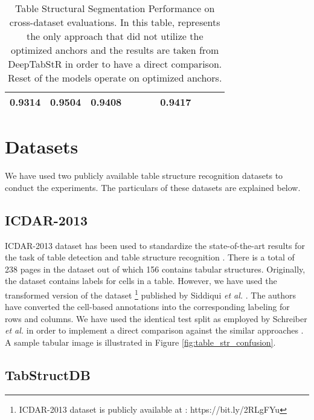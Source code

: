 \documentclass{ieeeaccess}
\begin{document}
\begin{table*}
\begin{tabularx}{\linewidth}{|u|u|t|v|v|k|v|v|k|k|}
        \footnotesize \centering \textbf{0.9314}&
        \footnotesize \centering \textbf{0.9504}&
        \footnotesize \centering \textbf{0.9408}&
        \footnotesize {}&
        \footnotesize {}&
        \footnotesize {}&
        \footnotesize 
        \textbf{0.9417} \\
        \hline


\end{tabularx}
    \caption{Table Structural Segmentation Performance on cross-dataset evaluations. In this table,  represents the only approach that did not utilize the optimized anchors and the results are taken from DeepTabStR \cite{b33} in order to have a direct comparison. Reset of the models operate on optimized anchors. }
    \label{tab:cross_dataset}
\end{table*} 




\section{Datasets}
\label{sec:datasets}
We have used two publicly available table structure recognition datasets to conduct the experiments. The particulars of these datasets are explained below.

\subsection{ICDAR-2013}

ICDAR-2013 \cite{b18} dataset has been used to standardize the state-of-the-art results for the task of table detection and table structure recognition \cite{b27, b32}. There is a total of 238 pages in the dataset out of which 156 contains tabular structures. Originally, the dataset contains labels for cells in a table. However, we have used the transformed version of the dataset \footnote{ICDAR-2013 dataset is publicly available at : https://bit.ly/2RLgFYu} published by Siddiqui \textit{et al.} \cite{b32}. The authors have converted the cell-based annotations into the corresponding labeling for rows and columns. We have used the identical test split as employed by Schreiber \textit{et al.} \cite{b27} in order to implement a direct comparison against the similar approaches \cite{b27,b32,b33}. A sample tabular image is illustrated in Figure \ref{fig:table_str_confusion}.

\subsection{TabStructDB}
\end{document}
